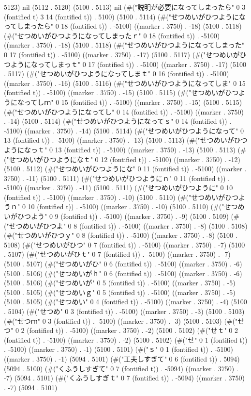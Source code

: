{{5123) nil (5112 . 5120) (5100 . 5113) nil (#("説明が必要になってしまったら" 0 3 (fontified t) 3 14 (fontified t)) . 5100) (5100 . 5114) (#("せつめいがひつようになってしまったら" 0 18 (fontified t)) . -5100) ((marker . 3750) . -18) (5100 . 5118) (#("せつめいがひつようになってしまったｒ" 0 18 (fontified t)) . -5100) ((marker . 3750) . -18) (5100 . 5118) (#("せつめいがひつようになってしまった" 0 17 (fontified t)) . -5100) ((marker . 3750) . -17) (5100 . 5117) (#("せつめいがひつようになってしまっｔ" 0 17 (fontified t)) . -5100) ((marker . 3750) . -17) (5100 . 5117) (#("せつめいがひつようになってしまｔ" 0 16 (fontified t)) . -5100) ((marker . 3750) . -16) (5100 . 5116) (#("せつめいがひつようになってしま" 0 15 (fontified t)) . -5100) ((marker . 3750) . -15) (5100 . 5115) (#("せつめいがひつようになってしｍ" 0 15 (fontified t)) . -5100) ((marker . 3750) . -15) (5100 . 5115) (#("せつめいがひつようになってし" 0 14 (fontified t)) . -5100) ((marker . 3750) . -14) (5100 . 5114) (#("せつめいがひつようになってｓ" 0 14 (fontified t)) . -5100) ((marker . 3750) . -14) (5100 . 5114) (#("せつめいがひつようになって" 0 13 (fontified t)) . -5100) ((marker . 3750) . -13) (5100 . 5113) (#("せつめいがひつようになっｔ" 0 13 (fontified t)) . -5100) ((marker . 3750) . -13) (5100 . 5113) (#("せつめいがひつようになｔ" 0 12 (fontified t)) . -5100) ((marker . 3750) . -12) (5100 . 5112) (#("せつめいがひつようにな" 0 11 (fontified t)) . -5100) ((marker . 3750) . -11) (5100 . 5111) (#("せつめいがひつようにｎ" 0 11 (fontified t)) . -5100) ((marker . 3750) . -11) (5100 . 5111) (#("せつめいがひつように" 0 10 (fontified t)) . -5100) ((marker . 3750) . -10) (5100 . 5110) (#("せつめいがひつようｎ" 0 10 (fontified t)) . -5100) ((marker . 3750) . -10) (5100 . 5110) (#("せつめいがひつよう" 0 9 (fontified t)) . -5100) ((marker . 3750) . -9) (5100 . 5109) (#("せつめいがひつよ" 0 8 (fontified t)) . -5100) ((marker . 3750) . -8) (5100 . 5108) (#("せつめいがひつｙ" 0 8 (fontified t)) . -5100) ((marker . 3750) . -8) (5100 . 5108) (#("せつめいがひつ" 0 7 (fontified t)) . -5100) ((marker . 3750) . -7) (5100 . 5107) (#("せつめいがひｔ" 0 7 (fontified t)) . -5100) ((marker . 3750) . -7) (5100 . 5107) (#("せつめいがひ" 0 6 (fontified t)) . -5100) ((marker . 3750) . -6) (5100 . 5106) (#("せつめいがｈ" 0 6 (fontified t)) . -5100) ((marker . 3750) . -6) (5100 . 5106) (#("せつめいが" 0 5 (fontified t)) . -5100) ((marker . 3750) . -5) (5100 . 5105) (#("せつめいｇ" 0 5 (fontified t)) . -5100) ((marker . 3750) . -5) (5100 . 5105) (#("せつめい" 0 4 (fontified t)) . -5100) ((marker . 3750) . -4) (5100 . 5104) (#("せつめ" 0 3 (fontified t)) . -5100) ((marker . 3750) . -3) (5100 . 5103) (#("せつｍ" 0 3 (fontified t)) . -5100) ((marker . 3750) . -3) (5100 . 5103) (#("せつ" 0 2 (fontified t)) . -5100) ((marker . 3750) . -2) (5100 . 5102) (#("せｔ" 0 2 (fontified t)) . -5100) ((marker . 3750) . -2) (5100 . 5102) (#("せ" 0 1 (fontified t)) . -5100) ((marker . 3750) . -1) (5100 . 5101) (#("ｓ" 0 1 (fontified t)) . -5100) ((marker . 3750) . -1) (5094 . 5101) (#("工夫しすぎて" 0 6 (fontified t)) . 5094) (5094 . 5100) (#("くふうしすぎて" 0 7 (fontified t)) . -5094) ((marker . 3750) . -7) (5094 . 5101) (#("くふうしすぎｔ" 0 7 (fontified t)) . -5094) ((marker . 3750) . -7) (5094 . 5101) }}
